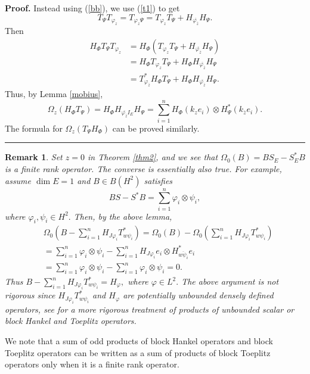 \documentclass{article}%
\newtheorem{remark}[theorem]{Remark}
\newenvironment{proof}[1][Proof]{\noindent\textbf{#1.} }{\ \rule{0.5em}{0.5em}}
\begin{document}
\begin{proof}
Instead using (\ref{bb}), we use (\ref{t1}) to get%
\[
T_{\Psi}T_{\varphi_{z}}=T_{\varphi_{z}\Psi}=T_{\varphi_{z}}T_{\Psi
}+H_{\overline{\varphi_{\overline{z}}}}H_{\Psi}.
\]
Then
\begin{align*}
H_{\Phi}T_{\Psi}T_{\varphi_{z}}  &  =H_{\Phi}(T_{\varphi_{z}}T_{\Psi
}+H_{\overline{\varphi_{\overline{z}}}}H_{\Psi})\\
&  =H_{\Phi}T_{\varphi_{z}}T_{\Psi}+H_{\Phi}H_{\overline{\varphi_{\overline
{z}}}}H_{\Psi}\\
&  =T_{\varphi_{\overline{z}}}^{\ast}H_{\Phi}T_{\Psi}+H_{\Phi}H_{\overline
{\varphi_{\overline{z}}}}H_{\Psi}.
\end{align*}
Thus, by Lemma \ref{mobius},
\[
\Omega_{z}(H_{\Phi}T_{\Psi})=H_{\Phi}H_{\overline{\varphi_{\overline{z}}}%
I_{E}}H_{\Psi}=\sum_{i=1}^{n}H_{\Phi}\left(  k_{z}e_{i}\right)  \otimes
H_{\Psi}^{\ast}\left(  k_{\overline{z}}e_{i}\right)  .
\]
The formula for $\Omega_{z}(T_{\Psi}H_{\Phi})$ can be proved similarly.
\end{proof}

\begin{remark}
\label{rm2}Set $z=0$ in Theorem \ref{thm2}, and we see that $\Omega
_{0}(B)=BS_{E}-S_{E}^{\ast}B$ is a finite rank operator. The converse is
essentially also true. For example, assume $\dim E=1$ and $B\in B(H^{2})$
satisfies%
\[
BS-S^{\ast}B=\sum_{i=1}^{n}\varphi_{i}\otimes\psi_{i},
\]
where $\varphi_{i},\psi_{i}\in H^{2}.$ Then, by the above lemma,
\begin{align*}
&  \Omega_{0}(B-\sum_{i=1}^{n}H_{J\varphi_{i}}T_{w\psi_{i}}^{\ast} )
=\Omega_{0}(B)-\Omega_{0}(\sum_{i=1}^{n}H_{J\varphi_{i}}T_{w\psi_{i}}^{\ast
})\\
&  =\sum_{i=1}^{n}\varphi_{i}\otimes\psi_{i}-\sum_{i=1}^{n}H_{J\varphi_{i}%
}e_{i}\otimes H_{\overline{w\psi_{i}}}^{\ast}e_{i}\\
&  =\sum_{i=1}^{n}\varphi_{i}\otimes\psi_{i}-\sum_{i=1}^{n}\varphi_{i}%
\otimes\psi_{i}=0.
\end{align*}
Thus $B-\sum_{i=1}^{n}H_{J\varphi_{i}}T_{w\psi_{i}}^{\ast}=H_{\varphi},$ where
$\varphi\in L^{2}.$ The above argument is not rigorous since $H_{J\varphi_{i}%
}T_{w\psi_{i}}^{\ast}$ and $H_{\varphi}$ are potentially unbounded densely
defined operators, see \cite{GuJFA2,GuH} for a more rigorous treatment of
products of unbounded scalar or block Hankel and Toeplitz operators.
\end{remark}

We note that a sum of odd products of block Hankel operators and block
Toeplitz operators can be written as a sum of products of block Toeplitz
operators only when it is a finite rank operator.
\end{document}
